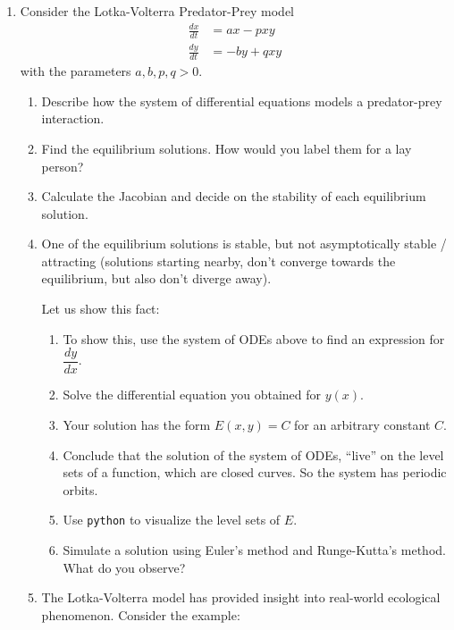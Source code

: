 \begin{enumerate}
	\item\label{q1} Consider the Lotka-Volterra Predator-Prey model
	\begin{align*}
		\frac{dx}{dt} & = ax - pxy  \tag{prey equation}\\
		\frac{dy}{dt} & = -by + qxy \tag{predator equation}
	\end{align*}
	with the parameters $a,b,p,q>0$.
	
	\begin{enumerate}
		\item Describe how the system of differential equations models a predator-prey interaction.
		\item Find the equilibrium solutions. How would you label them for a lay person?
		\item Calculate the Jacobian and decide on the stability of each equilibrium solution.
		\item One of the equilibrium solutions is stable, but not asymptotically stable / attracting (solutions starting nearby, don't converge towards the equilibrium, but also don't diverge away).
		
		Let us show this fact:
		\begin{enumerate}
			\item To show this, use the system of ODEs above to find an expression for $\dfrac{dy}{dx}$. 
			\item Solve the differential equation you obtained for $y(x)$.
			\item Your solution has the form $E(x,y) = C$ for an arbitrary constant $C$.
			\item Conclude that the solution of the system of ODEs, ``live'' on the level sets of a function, which are closed curves. So the system has periodic orbits.
			\item Use \texttt{python} to visualize the level sets of $E$.
			\item Simulate a solution using Euler's method and Runge-Kutta's method. What do you observe?
		\end{enumerate}
		
		\item The Lotka-Volterra model has provided insight into real-world ecological phenomenon. Consider the example:
		\begin{center}
		\end{center}
		

\end{enumerate}
\end{enumerate}

